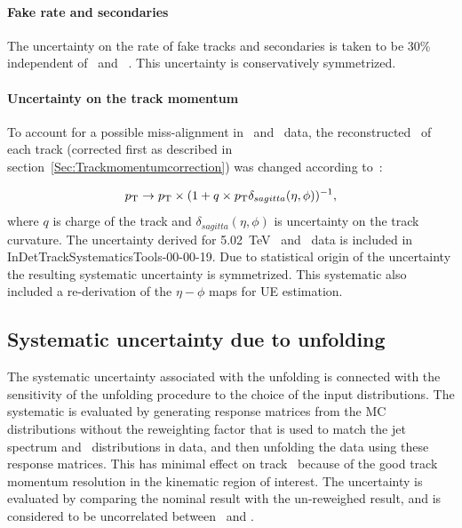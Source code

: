 \paragraph{Fake rate and secondaries}
The uncertainty on the rate of fake tracks and secondaries is taken to be 30\% independent of \pttrk\ and \etatrk~\cite{ref:tracktwiki, Nachman:2259091}.
This uncertainty is conservatively symmetrized.

\paragraph{Uncertainty on the track momentum}
To account for a possible miss-alignment in \pp\ and \PbPb\ data, the reconstructed \pT\ of each track (corrected first as described in section~\ref{Sec:Trackmomentumcorrection}) was changed according to~\cite{TrackingRec}:

\begin{equation}
\mbox{$p_{\mathrm{T}}$} \rightarrow \mbox{$p_{\mathrm{T}}$} \times (1 + q \times \mbox{$p_{\mathrm{T}}$} \delta_{sagitta}(\eta, \phi))^{-1},
\end{equation}
where $q$ is charge of the track and $\delta_{sagitta}(\eta, \phi)$ is uncertainty on the track curvature.
The uncertainty derived for 5.02~TeV \pp\ and \PbPb\ data is included in InDetTrackSystematicsTools-00-00-19.
Due to statistical origin of the uncertainty the resulting systematic uncertainty is symmetrized.
This systematic also included a re-derivation of the $\eta-\phi$ maps for UE estimation.

 

\subsection{Systematic uncertainty due to unfolding}
The systematic uncertainty associated with the unfolding is connected with the sensitivity of the unfolding procedure to the choice of the input distributions.
The systematic is evaluated by generating response matrices from the MC distributions without the reweighting factor that is used to match the jet spectrum and \Dptr\ distributions in data, and then unfolding the data using these response matrices.
This has minimal effect on track \pt\ because of the good track momentum resolution in the kinematic region of interest.
The uncertainty is evaluated by comparing the nominal result with the un-reweighed result, and is considered to be uncorrelated between \pbpb\ and \pp.


